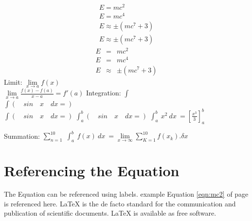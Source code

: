 \begin{eqnarray*}
E=mc^2 \\
E=mc^4\\
E \approx \pm (mc^7 +3)\\
E \approx \pm (mc^7 +3)
\end{eqnarray*}
\begin{eqnarray}
E &=& mc^2 \\
E &=& mc^4 \nonumber \\
E &\approx& \pm (mc^7 +3)
\end{eqnarray}
Limit:
$\lim \limits_{x \to a} f(x)$\\
$\lim \limits_{x \to a} \frac{f(x)-f(a)}{x-a}=f'(a)$
Integration:
$\int$\\
$\int(\quad sin\quad x\quad dx= ) $\\
$\displaystyle{\int(\quad sin\quad x\quad dx= )} $
$\displaystyle{\int^b_a(\quad sin\quad x\quad dx= )} $
$\displaystyle{\int^b_a\: x^2\: dx\:=\left[\frac{x^3}{3}\right]^b_a} $


Summation:
$\displaystyle{\sum_{n=1}^{10}}$
$\displaystyle{\int^b_a\: f(x)\: dx\:=\lim \limits_{x \to \infty}\displaystyle{\sum_{K=1}^{10}f(x_k).\delta x}} $

\section{Referencing the Equation}
The Equation can be referenced using labels. example Equation \ref{eqn:mc2} of page \pageref{eqn:mc2} is referenced here.
LaTeX is the de facto standard for the communication and publication of scientific documents. LaTeX is available as free software.

